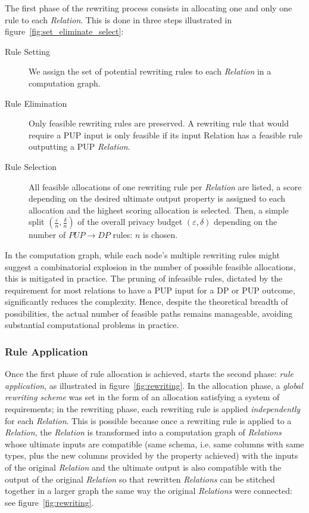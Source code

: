 \documentclass[letterpaper]{article} %
\begin{document}
The first phase of the rewriting process consists in allocating one and only one rule to each \emph{Relation}.
This is done in three steps illustrated in figure~\ref{fig:set_eliminate_select}:
\begin{description}
    \item[Rule Setting] We assign the set of potential rewriting rules to each \emph{Relation} in a computation graph.
    \item[Rule Elimination] Only feasible rewriting rules are preserved. A rewriting rule that would require a PUP input is only feasible if its input Relation has a feasible rule outputting a PUP \emph{Relation}.
    \item[Rule Selection] All feasible allocations of one rewriting rule per \emph{Relation} are listed, a score depending on the desired ultimate output property is assigned to each allocation and the highest scoring allocation is selected. Then, a simple split $\left(\frac{\varepsilon}{n}, \frac{\delta}{n}\right)$ of the overall privacy budget $\left(\varepsilon, \delta\right)$ depending on the number of $PUP \rightarrow DP$ rules: $n$ is chosen.
\end{description}

In the computation graph, while each node's multiple rewriting rules might suggest a combinatorial explosion in the number of possible feasible allocations, this is mitigated in practice. The pruning of infeasible rules, dictated by the requirement for most relations to have a PUP input for a DP or PUP outcome, significantly reduces the complexity. Hence, despite the theoretical breadth of possibilities, the actual number of feasible paths remains manageable, avoiding substantial computational problems in practice.

\subsubsection{Rule Application}

Once the first phase of rule allocation is achieved, starts the second phase: \emph{rule application}, as illustrated in figure~\ref{fig:rewriting}.
In the allocation phase, a \emph{global rewriting scheme} was set in the form of an allocation satisfying a system of requirements; in the rewriting phase, each rewriting rule is applied \emph{independently} for each \emph{Relation}. This is possible because once a rewriting rule is applied to a \emph{Relation}, the \emph{Relation} is transformed into a computation graph of \emph{Relations} whose ultimate inputs are compatible (same schema, i.e. same columns with same types, plus the new columns provided by the property achieved) with the inputs of the original \emph{Relation} and the ultimate output is also compatible with the output of the original \emph{Relation} so that rewritten \emph{Relations} can be stitched together in a larger graph the same way the original \emph{Relations} were connected: see figure~\ref{fig:rewriting}.
\end{document}
